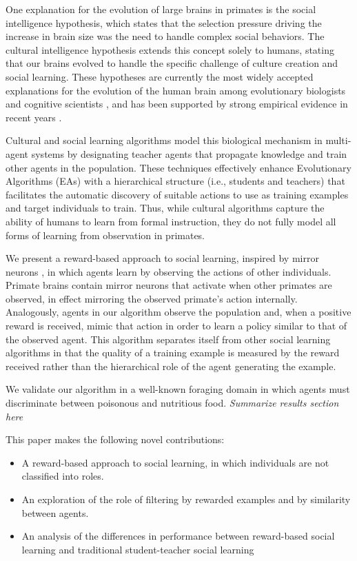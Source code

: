 \documentclass{acm_proc_article-sp}
\begin{document}
One explanation for the evolution of large brains in primates is the social intelligence hypothesis, which states that the selection pressure driving the increase in brain size was the need to handle complex social behaviors. The cultural intelligence hypothesis extends this concept solely to humans, stating that our brains evolved to handle the specific challenge of culture creation and social learning. These hypotheses are currently the most widely accepted explanations for the evolution of the human brain among evolutionary biologists and cognitive scientists \cite{holekamp2007questioning}, and has been supported by strong empirical evidence in recent years \cite{herrmann2007humans}.

Cultural and social learning algorithms \cite{reynolds1994introduction} model this biological mechanism in multi-agent systems by designating teacher agents that propagate knowledge and train other agents in the population. These techniques effectively enhance Evolutionary Algorithms (EAs) with a hierarchical structure (i.e., students and teachers) that facilitates the automatic discovery of suitable actions to use as training examples and target individuals to train. Thus, while cultural algorithms capture the ability of humans to learn from formal instruction, they do not fully model all forms of learning from observation in primates.

We present a reward-based approach to social learning, inspired by mirror neurons \cite{gallese-98}, in which agents learn by observing the actions of other individuals. Primate brains contain mirror neurons that activate when other primates are observed, in effect mirroring the observed primate's action internally. Analogously, agents in our algorithm observe the population and, when a positive reward is received, mimic that action in order to learn a policy similar to that of the observed agent. This algorithm separates itself from other social learning algorithms in that the quality of a training example is measured by the reward received rather than the hierarchical role of the agent generating the example.

We validate our algorithm in a well-known foraging domain in which agents must discriminate between poisonous and nutritious food. \textit{Summarize results section here}

This paper makes the following novel contributions:
 
\begin{itemize}
\item A reward-based approach to social learning, in which individuals are not classified into roles.
\item An exploration of the role of filtering by rewarded examples and by similarity between agents.
\item An analysis of the differences in performance between reward-based social learning and traditional student-teacher social learning
\end{itemize}
 
\end{document}
